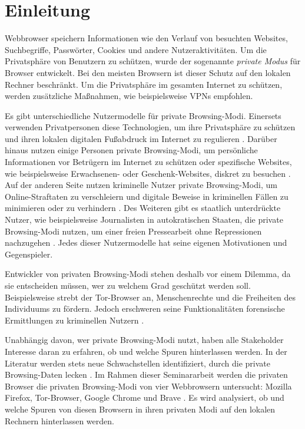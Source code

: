 \chapter{Einleitung}
Webbrowser speichern Informationen wie den Verlauf von besuchten Websites, Suchbegriffe, Passwörter, Cookies und andere Nutzeraktivitäten. 
Um die Privatsphäre von Benutzern zu schützen, wurde der sogenannte \textit{private Modus} für Browser entwickelt.
Bei den meisten Browsern ist dieser Schutz auf den lokalen Rechner beschränkt. \cite{Rochmadi.2017} Um die Privatsphäre im gesamten Internet zu schützen, werden zusätzliche Maßnahmen, wie beispielsweise VPNs empfohlen. \cite{Perdices.2023}

Es gibt unterschiedliche Nutzermodelle für private Browsing-Modi. Einersets verwenden Privatpersonen diese Technologien, um ihre Privatsphäre zu schützen und ihren lokalen digitalen Fußabdruck im Internet zu regulieren \cite{Horsman.2019}. Darüber hinaus nutzen einige Personen private Browsing-Modi, um persönliche Informationen vor Betrügern im Internet zu schützen oder spezifische Websites, wie beispielsweise Erwachsenen- oder Geschenk-Websites, diskret zu besuchen \cite{Aggarwal.2010}. Auf der anderen Seite nutzen kriminelle Nutzer private Browsing-Modi, um Online-Straftaten zu verschleiern und digitale Beweise in kriminellen Fällen zu minimieren oder zu verhindern \cite{Montasari.2015, Rochmadi.2017}. Des Weiteren gibt es staatlich unterdrückte Nutzer, wie beispielsweise Journalisten in autokratischen Staaten, die private Browsing-Modi nutzen, um einer freien Pressearbeit ohne Repressionen nachzugehen \cite{Rathod.2017}. Jedes dieser Nutzermodelle hat seine eigenen Motivationen und Gegenspieler.

Entwickler von privaten Browsing-Modi stehen deshalb vor einem Dilemma, da sie entscheiden müssen, wer zu welchem Grad geschützt werden soll. Beispielsweise strebt der Tor-Browser an, Menschenrechte und die Freiheiten des Individuums zu fördern. \cite{Tor.24.05.2023}
Jedoch erschweren seine Funktionalitäten forensische Ermittlungen zu kriminellen Nutzern \cite{Muir.2019, Rathod.2017}.

Unabhängig davon, wer private Browsing-Modi nutzt, haben alle Stakeholder Interesse daran zu erfahren, ob und welche Spuren hinterlassen werden. In der Literatur werden stets neue Schwachstellen identifiziert, durch die private Browsing-Daten \grqq{}lecken\grqq{} \cite{Satvat.2014}.
Im Rahmen dieser Seminararbeit werden die privaten Browser die privaten Browsing-Modi von vier Webbrowsern untersucht: Mozilla Firefox, Tor-Browser, Google Chrome und Brave \cite{Montasari.2015}. Es wird analysiert, ob und welche Spuren von diesen Browsern in ihren privaten Modi auf den lokalen Rechnern hinterlassen werden.

